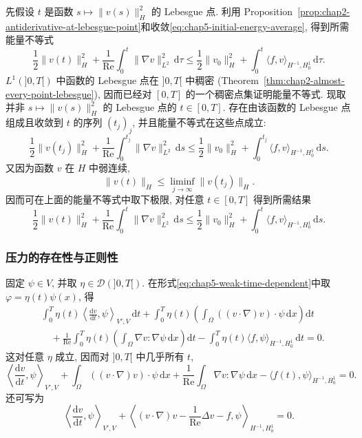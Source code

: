 \begin{itemize}
 先假设 $t$ 是函数 $s\mapsto\|v(s)\|_H^2$ 的 Lebesgue 点. 利用 Proposition~\ref{prop:chap2-antiderivative-at-lebesgue-point}和收敛\eqref{eq:chap5-initial-energy-average}, 得到所需能量不等式
 \[
  \frac12\|v(t)\|_H^2
  +\frac1{\operatorname{Re}}\int_0^t\|\nabla v\|_{L^2}^2\,\mathrm d\tau
  \leq\frac12\|v_0\|_H^2
  +\int_0^t\langle f,v\rangle_{H^{-1},H_0^1}\,\mathrm d\tau.
 \]
 $L^1(]0,T[)$ 中函数的 Lebesgue 点在 $]0,T[$ 中稠密 (Theorem~\ref{thm:chap2-almost-every-point-lebesgue}), 因而已经对 $[0,T]$ 的一个稠密点集证明能量不等式. 现取并非 $s\mapsto\|v(s)\|_H^2$ 的 Lebesgue 点的 $t\in[0,T]$. 存在由该函数的 Lebesgue 点组成且收敛到 $t$ 的序列 $(t_j)_j$, 并且能量不等式在这些点成立:
 \[
  \frac12\|v(t_j)\|_H^2
  +\frac1{\operatorname{Re}}\int_0^{t_j}\|\nabla v\|_{L^2}^2\,\mathrm ds
  \leq\frac12\|v_0\|_H^2
  +\int_0^{t_j}\langle f,v\rangle_{H^{-1},H_0^1}\,\mathrm ds.
 \]
 又因为函数 $v$ 在 $H$ 中弱连续,
 \[
  \|v(t)\|_H\leq\liminf_{j\to\infty}\|v(t_j)\|_H.
 \]
 因而可在上面的能量不等式中取下极限, 对任意 $t\in[0,T]$ 得到所需结果
 \[
  \frac12\|v(t)\|_H^2
  +\frac1{\operatorname{Re}}\int_0^t\|\nabla v\|_{L^2}^2\,\mathrm ds
  \leq\frac12\|v_0\|_H^2
  +\int_0^t\langle f,v\rangle_{H^{-1},H_0^1}\,\mathrm ds.
 \]
\end{itemize}

\subsubsection{压力的存在性与正则性}
\label{subsec:chap5-pressure}

固定 $\psi\in V$, 并取 $\eta\in\mathcal D(]0,T[)$. 在形式\eqref{eq:chap5-weak-time-dependent}中取 $\varphi=\eta(t)\psi(x)$, 得
\begin{align*}
 &\int_0^T\eta(t)\left\langle\frac{\mathrm dv}{\mathrm dt},\psi\right\rangle_{V',V}\,\mathrm dt
 +\int_0^T\eta(t)\left(\int_\Omega((v\cdot\nabla)v)\cdot\psi\,\mathrm dx\right)\mathrm dt\\
 &\quad+\frac1{\operatorname{Re}}\int_0^T\eta(t)\left(\int_\Omega\nabla v:\nabla\psi\,\mathrm dx\right)\mathrm dt
 -\int_0^T\eta(t)\langle f,\psi\rangle_{H^{-1},H_0^1}\,\mathrm dt=0.
\end{align*}
这对任意 $\eta$ 成立, 因而对 $]0,T[$ 中几乎所有 $t$,
\[
 \left\langle\frac{\mathrm dv}{\mathrm dt},\psi\right\rangle_{V',V}
 +\int_\Omega((v\cdot\nabla)v)\cdot\psi\,\mathrm dx
 +\frac1{\operatorname{Re}}\int_\Omega\nabla v:\nabla\psi\,\mathrm dx
 -\langle f(t),\psi\rangle_{H^{-1},H_0^1}=0.
\]
还可写为
\begin{equation}
 \left\langle\frac{\mathrm dv}{\mathrm dt},\psi\right\rangle_{V',V}
 +\left\langle(v\cdot\nabla)v-\frac1{\operatorname{Re}}\Delta v-f,\psi\right\rangle_{H^{-1},H_0^1}=0.
\label{eq:chap5-pressure-instantaneous-orthogonality}
\end{equation}

